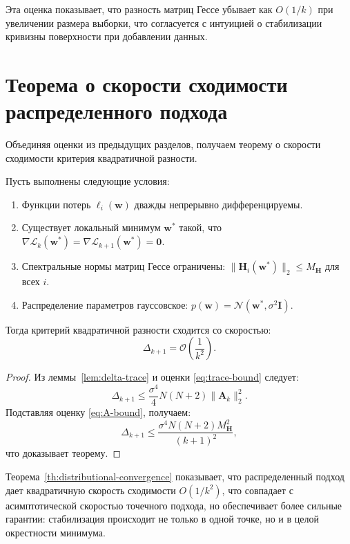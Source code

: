 Эта оценка показывает, что разность матриц Гессе убывает как $O(1/k)$ при увеличении размера выборки, что согласуется с интуицией о стабилизации кривизны поверхности при добавлении данных.

\section{Теорема о скорости сходимости распределенного подхода}

Объединяя оценки из предыдущих разделов, получаем теорему о скорости сходимости критерия квадратичной разности.

\begin{theorem}\label{th:distributional-convergence}
Пусть выполнены следующие условия:
\begin{enumerate}
\item Функции потерь $\ell_i(\mathbf{w})$ дважды непрерывно дифференцируемы.
\item Существует локальный минимум $\mathbf{w}^*$ такой, что $\nabla \mathcal{L}_k(\mathbf{w}^*) = \nabla \mathcal{L}_{k+1}(\mathbf{w}^*) = \mathbf{0}$.
\item Спектральные нормы матриц Гессе ограничены: $\|\mathbf{H}_i(\mathbf{w}^*)\|_2 \leqslant M_{\mathbf{H}}$ для всех $i$.
\item Распределение параметров гауссовское: $p(\mathbf{w}) = \mathcal{N}(\mathbf{w}^*, \sigma^2 \mathbf{I})$.
\end{enumerate}
Тогда критерий квадратичной разности сходится со скоростью:
\begin{equation}
\label{eq:delta-convergence-rate}
\Delta_{k+1} = \mathcal{O}\left(\frac{1}{k^2}\right).
\end{equation}
\end{theorem}

\begin{proof}
Из леммы~\ref{lem:delta-trace} и оценки \eqref{eq:trace-bound} следует:
\[
\Delta_{k+1} \leqslant \frac{\sigma^4}{4} N(N+2) \|\mathbf{A}_k\|_2^2.
\]
Подставляя оценку \eqref{eq:A-bound}, получаем:
\[
\Delta_{k+1} \leqslant \frac{\sigma^4 N(N+2) M_{\mathbf{H}}^2}{(k+1)^2},
\]
что доказывает теорему.
\end{proof}

Теорема~\ref{th:distributional-convergence} показывает, что распределенный подход дает квадратичную скорость сходимости $O(1/k^2)$, что совпадает с асимптотической скоростью точечного подхода, но обеспечивает более сильные гарантии: стабилизация происходит не только в одной точке, но и в целой окрестности минимума.

